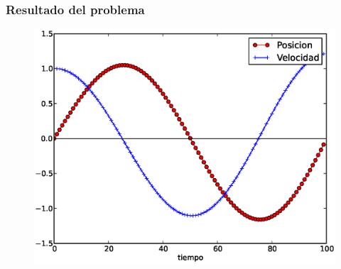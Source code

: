 \begin{frame}
\frametitle{Resultado del problema}
\begin{figure}
	\centering
	\includegraphics[scale=0.5]{Imagenes/EjerMecanica01.eps} 
\end{figure}
\end{frame}
